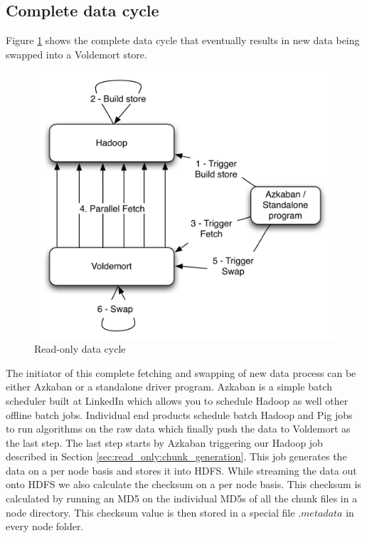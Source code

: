 \documentclass[10pt,twocolumn,preprint,natbib,authoryear]{sigplanconf}
\begin{document}

\subsection{Complete data cycle}
\label{sec:read_only:data_cycle}

Figure \ref{cycle} shows the complete data cycle that eventually results in new data being swapped into a Voldemort store. 

\begin{figure}
  \centering
    \includegraphics[scale=0.60]{cycle.png}
  \caption{Read-only data cycle}
  \label{cycle}
\end{figure}

The initiator of this complete fetching and swapping of new data process can be either Azkaban or a standalone driver program. Azkaban\cite{Azkaban} is a simple batch scheduler built at LinkedIn which allows you to schedule Hadoop as well other offline batch jobs. Individual end products schedule batch Hadoop and Pig jobs to run algorithms on the raw data which finally push the data to Voldemort as the last step. The last step starts by Azkaban triggering our Hadoop job described in Section \ref{sec:read_only:chunk_generation}. This job generates the data on a per node basis and stores it into HDFS. While streaming the data out onto HDFS we also calculate the checksum on a per node basis. This checksum is calculated by running an MD5 on the individual MD5s of all the chunk files in a node directory. This checksum value is then stored in a special file $.metadata$ in every node folder. 
\end{document}

